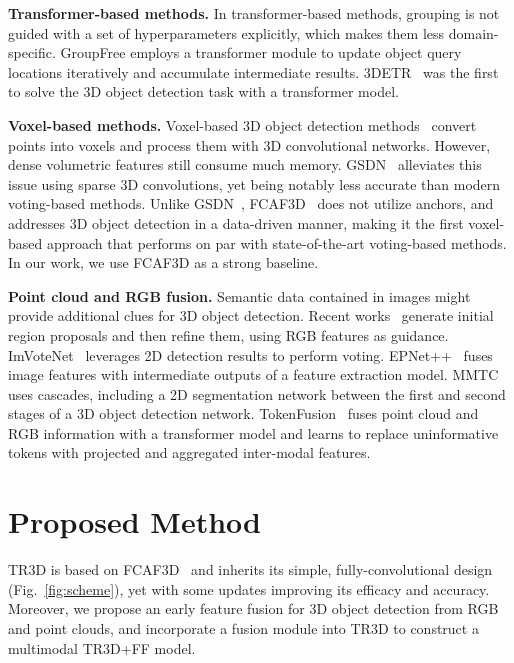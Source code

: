 \documentclass{article}
\def\ours{TR3D}
\def\oursff{TR3D+FF}
\newcommand\inline{\noindent\textbf}
\begin{document}
\inline{Transformer-based methods.} In transformer-based methods, grouping is not guided with a set of hyperparameters explicitly, which makes them less domain-specific. GroupFree \cite{liu2021group-free} employs a transformer module to update object query locations iteratively and accumulate intermediate results. 3DETR~\cite{misra20213detr} was the first to solve the 3D object detection task with a transformer model.

\inline{Voxel-based methods.} Voxel-based 3D object detection methods~\cite{rukhovich2022fcaf3d, hou20193dsis, gwak2020gsdn} convert points into voxels and process them with 3D convolutional networks. However, dense volumetric features still consume much memory. GSDN~\cite{gwak2020gsdn} alleviates this issue using sparse 3D convolutions, yet being notably less accurate than modern voting-based methods. Unlike GSDN~\cite{gwak2020gsdn}, FCAF3D~\cite{rukhovich2022fcaf3d} does not utilize anchors, and addresses 3D object detection in a data-driven manner, making it the first voxel-based approach that performs on par with state-of-the-art voting-based methods. In our work, we use FCAF3D as a strong baseline.

\inline{Point cloud and RGB fusion.} 
Semantic data contained in images might provide additional clues for 3D object detection. 
Recent works~\cite{qi2020imvotenet, huang2020epnet, liu2021epnetcb} generate initial region proposals and then refine them, using RGB features as guidance. ImVoteNet~\cite{qi2020imvotenet} leverages 2D detection results to perform voting. 
EPNet++~\cite{liu2021epnetcb} fuses image features with intermediate outputs of a feature extraction model. 
MMTC~\cite{park2021multimodal} uses cascades, including a 2D segmentation network between the first and second stages of a 3D object detection network. TokenFusion~\cite{wang2022multimodal} fuses point cloud and RGB information with a transformer model and learns to replace uninformative tokens with projected and aggregated inter-modal features. 



\section{Proposed Method}
\label{sec:method}

\ours{} is based on FCAF3D~\cite{rukhovich2022fcaf3d} and inherits its simple, fully-convolutional design (Fig.~\ref{fig:scheme}), yet with some updates improving its efficacy and accuracy. Moreover, we propose an early feature fusion for 3D object detection from RGB and point clouds, and incorporate a fusion module into \ours{} to construct a multimodal \oursff{} model.
\end{document}
